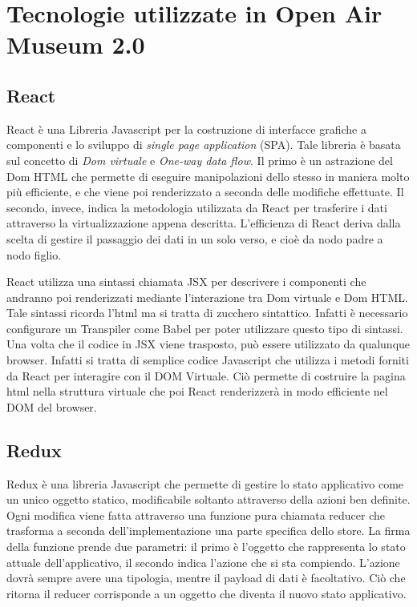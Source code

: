 \section{Tecnologie utilizzate in Open Air Museum 2.0}\vspace{5mm}

	\subsection{React}\vspace{5mm}

React\cite{React} è una Libreria Javascript per la costruzione di interfacce grafiche a componenti e lo sviluppo di \emph{single page application} (SPA). Tale libreria è basata sul concetto di \emph{Dom virtuale} e \emph{One-way data flow}. Il primo è un astrazione del Dom HTML che permette di eseguire manipolazioni dello stesso in maniera molto più efficiente, e che viene poi renderizzato a seconda delle modifiche effettuate. Il secondo, invece, indica la metodologia utilizzata da React per trasferire i dati attraverso la virtualizzazione appena descritta. L'efficienza di React deriva dalla scelta di gestire il passaggio dei dati in un solo verso, e cioè da nodo padre a nodo figlio.\vspace{5mm}

React utilizza una sintassi chiamata JSX per descrivere i componenti che andranno poi renderizzati mediante l'interazione tra Dom virtuale e Dom HTML. Tale sintassi ricorda l'html ma si tratta di zucchero sintattico. Infatti è necessario configurare un Transpiler come Babel per poter utilizzare questo tipo di sintassi. Una volta che il codice in JSX viene trasposto, può essere utilizzato da qualunque browser. Infatti si tratta di semplice codice Javascript che utilizza i metodi forniti da React per interagire con il DOM Virtuale. Ciò permette di costruire la pagina html nella struttura virtuale che poi React renderizzerà in modo efficiente nel DOM del browser.


	\subsection{Redux}\vspace{5mm}
	
	Redux è una libreria Javascript che permette di gestire lo stato applicativo come un unico oggetto statico, modificabile soltanto attraverso della azioni ben definite. Ogni modifica viene fatta attraverso una funzione pura\cite{PureFunction} chiamata reducer che trasforma a seconda dell'implementazione una parte specifica dello store. La firma della funzione prende due parametri: il primo è l'oggetto che rappresenta lo stato attuale dell'applicativo, il secondo indica l'azione che si sta compiendo. L'azione dovrà sempre avere una tipologia, mentre il payload di dati è facoltativo. Ciò che ritorna il reducer corrisponde a un oggetto che diventa il nuovo stato applicativo.\vspace{5mm}
	
